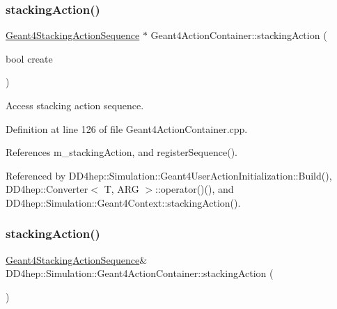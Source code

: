 \subsubsection{\texorpdfstring{stacking\+Action()}{stackingAction()}\hspace{0.1cm}{\footnotesize\ttfamily [1/2]}}
{\footnotesize\ttfamily \hyperlink{class_d_d4hep_1_1_simulation_1_1_geant4_stacking_action_sequence}{Geant4\+Stacking\+Action\+Sequence} $\ast$ Geant4\+Action\+Container\+::stacking\+Action (\begin{DoxyParamCaption}\item[{bool}]{create }\end{DoxyParamCaption})}



Access stacking action sequence. 



Definition at line 126 of file Geant4\+Action\+Container.\+cpp.



References m\+\_\+stacking\+Action, and register\+Sequence().



Referenced by D\+D4hep\+::\+Simulation\+::\+Geant4\+User\+Action\+Initialization\+::\+Build(), D\+D4hep\+::\+Converter$<$ T, A\+R\+G $>$\+::operator()(), and D\+D4hep\+::\+Simulation\+::\+Geant4\+Context\+::stacking\+Action().

\hypertarget{class_d_d4hep_1_1_simulation_1_1_geant4_action_container_a688c893718ea08ea0c7fe7432506915b}{}\label{class_d_d4hep_1_1_simulation_1_1_geant4_action_container_a688c893718ea08ea0c7fe7432506915b} 
\subsubsection{\texorpdfstring{stacking\+Action()}{stackingAction()}\hspace{0.1cm}{\footnotesize\ttfamily [2/2]}}
{\footnotesize\ttfamily \hyperlink{class_d_d4hep_1_1_simulation_1_1_geant4_stacking_action_sequence}{Geant4\+Stacking\+Action\+Sequence}\& D\+D4hep\+::\+Simulation\+::\+Geant4\+Action\+Container\+::stacking\+Action (\begin{DoxyParamCaption}{ }\end{DoxyParamCaption})\hspace{0.3cm}{\ttfamily [inline]}}



